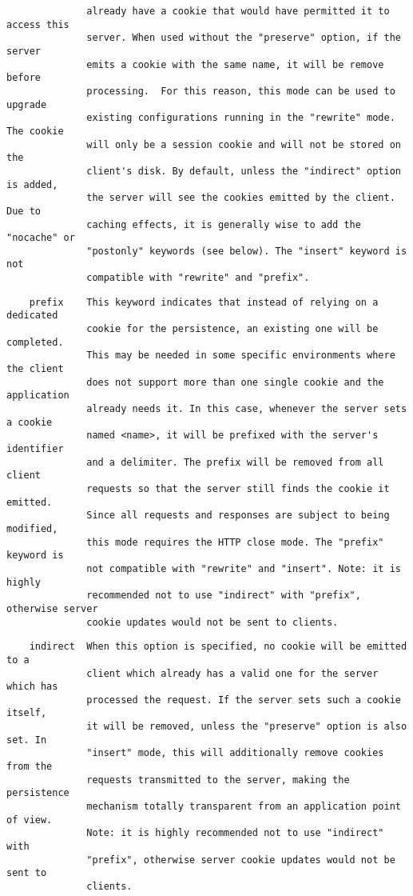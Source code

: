 \begin{verbatim}
              already have a cookie that would have permitted it to access this
              server. When used without the "preserve" option, if the server
              emits a cookie with the same name, it will be remove before
              processing.  For this reason, this mode can be used to upgrade
              existing configurations running in the "rewrite" mode. The cookie
              will only be a session cookie and will not be stored on the
              client's disk. By default, unless the "indirect" option is added,
              the server will see the cookies emitted by the client. Due to
              caching effects, it is generally wise to add the "nocache" or
              "postonly" keywords (see below). The "insert" keyword is not
              compatible with "rewrite" and "prefix".
\end{verbatim}

\begin{verbatim}
    prefix    This keyword indicates that instead of relying on a dedicated
              cookie for the persistence, an existing one will be completed.
              This may be needed in some specific environments where the client
              does not support more than one single cookie and the application
              already needs it. In this case, whenever the server sets a cookie
              named <name>, it will be prefixed with the server's identifier
              and a delimiter. The prefix will be removed from all client
              requests so that the server still finds the cookie it emitted.
              Since all requests and responses are subject to being modified,
              this mode requires the HTTP close mode. The "prefix" keyword is
              not compatible with "rewrite" and "insert". Note: it is highly
              recommended not to use "indirect" with "prefix", otherwise server
              cookie updates would not be sent to clients.
\end{verbatim}

\begin{verbatim}
    indirect  When this option is specified, no cookie will be emitted to a
              client which already has a valid one for the server which has
              processed the request. If the server sets such a cookie itself,
              it will be removed, unless the "preserve" option is also set. In
              "insert" mode, this will additionally remove cookies from the
              requests transmitted to the server, making the persistence
              mechanism totally transparent from an application point of view.
              Note: it is highly recommended not to use "indirect" with
              "prefix", otherwise server cookie updates would not be sent to
              clients.
\end{verbatim}

